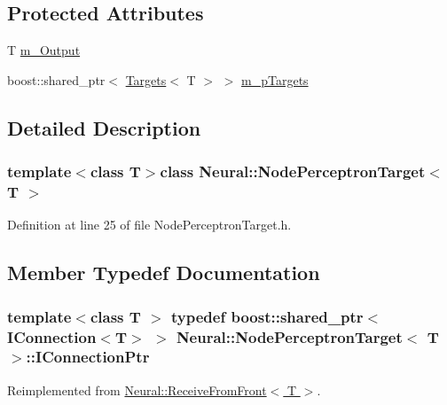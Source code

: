 \subsection*{Protected Attributes}
\begin{DoxyCompactItemize}
\item 
T \hyperlink{class_neural_1_1_node_perceptron_target_ae2cb7933fb287d7b173d9e31a55a5897}{m\_\-Output}
\item 
boost::shared\_\-ptr$<$ \hyperlink{class_neural_1_1_targets}{Targets}$<$ T $>$ $>$ \hyperlink{class_neural_1_1_node_perceptron_target_a13357af933db537d60b1c6994a27371c}{m\_\-pTargets}
\end{DoxyCompactItemize}


\subsection{Detailed Description}
\subsubsection*{template$<$class T$>$class Neural::NodePerceptronTarget$<$ T $>$}



Definition at line 25 of file NodePerceptronTarget.h.



\subsection{Member Typedef Documentation}
\hypertarget{class_neural_1_1_node_perceptron_target_abdb5cb819de661fc83edb4eceb81f7e8}{
\subsubsection[{IConnectionPtr}]{\setlength{\rightskip}{0pt plus 5cm}template$<$class T $>$ typedef boost::shared\_\-ptr$<$ {\bf IConnection}$<$T$>$ $>$ {\bf Neural::NodePerceptronTarget}$<$ T $>$::{\bf IConnectionPtr}}}
\label{class_neural_1_1_node_perceptron_target_abdb5cb819de661fc83edb4eceb81f7e8}


Reimplemented from \hyperlink{class_neural_1_1_receive_from_front_abf496040ce9745e7e1fc8274f9492295}{Neural::ReceiveFromFront$<$ T $>$}.



